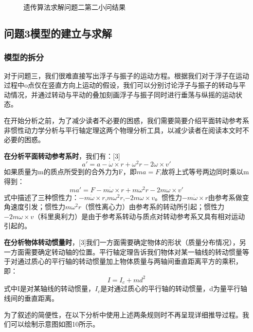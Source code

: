 \documentclass[12pt,utf8]{article}
\begin{document}
\begin{figure}[htbp]
{\begin{minipage}[t]{0.5\textwidth}
		\end{minipage}
	}
	\caption{遗传算法求解问题二第二小问结果}
\end{figure}


\subsection{问题3模型的建立与求解}

\subsubsection{模型的拆分}

对于问题三，我们很难直接写出浮子与振子的运动方程。根据我们对于浮子在运动过程中o点仅在竖直方向上运动的假设，我们可以分别讨论浮子与振子的转动与平动情况，并通过转动与平动的叠加刻画浮子与振子同时进行垂荡与纵摇的运动状态。

在开始分析之前，为了减少读者不必要的困惑，我们需要简要介绍平面转动参考系非惯性动力学分析与平行轴定理这两个物理分析工具，以减少读者在阅读本文时不必要的困惑。

\textbf{在分析平面转动参考系时}，我们有：[3]
$$
	a'=a-\dot{\omega}\times r+\omega^2r-2\omega\times v'
$$
如果质量为m的质点所受到的合外力为F，即$ma=F$,故将上式等号两边同时乘以m得到：
$$
	ma'=F-m\dot{\omega}\times r+m\omega^2r-2m\omega\times v'
$$
式中描述了三种惯性力：$-m\dot{\omega}\times r$,$m\omega^2r$,$-2m\omega\times v$。惯性力$-m\dot{\omega}\times r$由参考系做变角速度引发；惯性力$m\omega^2r$（惯性离心力）由参考系的转动所引起；惯性力$-2m\omega\times v$（科里奥利力）是由于参考系转动与质点对转动参考系又具有相对运动引起的。

\textbf{在分析物体转动惯量时}，[3]我们一方面需要确定物体的形状（质量分布情况），另一方面需要确定转动轴的位置。平行轴定理告诉我们物体对某一轴线的转动惯量等于对通过质心的平行轴的转动惯量加上物体质量与两轴间垂直距离平方的乘积，即：
$$
	I = I_c+md^2
$$
式中I是对某轴线的转动惯量，$I_c$是对通过质心的平行轴的转动惯量，d为量平行轴线间的垂直距离。

为了叙述的简便性，在以下分析中使用上述两条规则时不再呈现详细推导过程。我们可以绘制示意图如图10所示。
\end{document}
